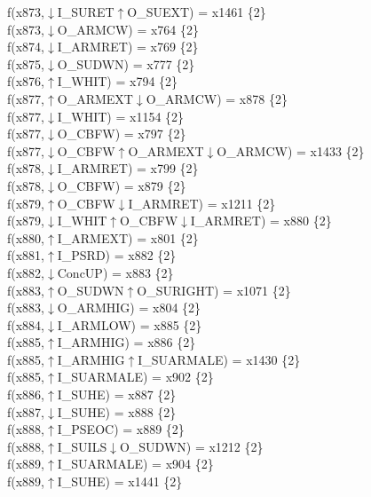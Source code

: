 f(x873,$\downarrow$I\_SURET$\uparrow$O\_SUEXT) = x1461 \{2\} \\  
f(x873,$\downarrow$O\_ARMCW) = x764 \{2\} \\  
f(x874,$\downarrow$I\_ARMRET) = x769 \{2\} \\  
f(x875,$\downarrow$O\_SUDWN) = x777 \{2\} \\  
f(x876,$\uparrow$I\_WHIT) = x794 \{2\} \\  
f(x877,$\uparrow$O\_ARMEXT$\downarrow$O\_ARMCW) = x878 \{2\} \\  
f(x877,$\downarrow$I\_WHIT) = x1154 \{2\} \\  
f(x877,$\downarrow$O\_CBFW) = x797 \{2\} \\  
f(x877,$\downarrow$O\_CBFW$\uparrow$O\_ARMEXT$\downarrow$O\_ARMCW) = x1433 \{2\} \\  
f(x878,$\downarrow$I\_ARMRET) = x799 \{2\} \\  
f(x878,$\downarrow$O\_CBFW) = x879 \{2\} \\  
f(x879,$\uparrow$O\_CBFW$\downarrow$I\_ARMRET) = x1211 \{2\} \\  
f(x879,$\downarrow$I\_WHIT$\uparrow$O\_CBFW$\downarrow$I\_ARMRET) = x880 \{2\} \\  
f(x880,$\uparrow$I\_ARMEXT) = x801 \{2\} \\  
f(x881,$\uparrow$I\_PSRD) = x882 \{2\} \\  
f(x882,$\downarrow$ConcUP) = x883 \{2\} \\  
f(x883,$\uparrow$O\_SUDWN$\uparrow$O\_SURIGHT) = x1071 \{2\} \\  
f(x883,$\downarrow$O\_ARMHIG) = x804 \{2\} \\  
f(x884,$\downarrow$I\_ARMLOW) = x885 \{2\} \\  
f(x885,$\uparrow$I\_ARMHIG) = x886 \{2\} \\  
f(x885,$\uparrow$I\_ARMHIG$\uparrow$I\_SUARMALE) = x1430 \{2\} \\  
f(x885,$\uparrow$I\_SUARMALE) = x902 \{2\} \\  
f(x886,$\uparrow$I\_SUHE) = x887 \{2\} \\  
f(x887,$\downarrow$I\_SUHE) = x888 \{2\} \\  
f(x888,$\uparrow$I\_PSEOC) = x889 \{2\} \\  
f(x888,$\uparrow$I\_SUILS$\downarrow$O\_SUDWN) = x1212 \{2\} \\  
f(x889,$\uparrow$I\_SUARMALE) = x904 \{2\} \\  
f(x889,$\uparrow$I\_SUHE) = x1441 \{2\} \\  
